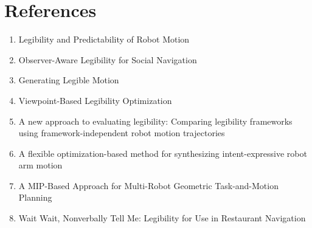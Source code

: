 \documentclass[11pt]{article}
\begin{document}



    \section{References}

    \begin{enumerate}
        \item Legibility and Predictability of Robot Motion
        \item Observer-Aware Legibility for Social Navigation
        \item Generating Legible Motion
        \item Viewpoint-Based Legibility Optimization
        \item A new approach to evaluating legibility: Comparing legibility frameworks using framework-independent robot motion trajectories
        \item A flexible optimization-based method for synthesizing intent-expressive robot arm motion
        \item A MIP-Based Approach for Multi-Robot Geometric Task-and-Motion Planning
        \item Wait Wait, Nonverbally Tell Me: Legibility for Use in Restaurant Navigation

    \end{enumerate}


%
%
\end{document}
